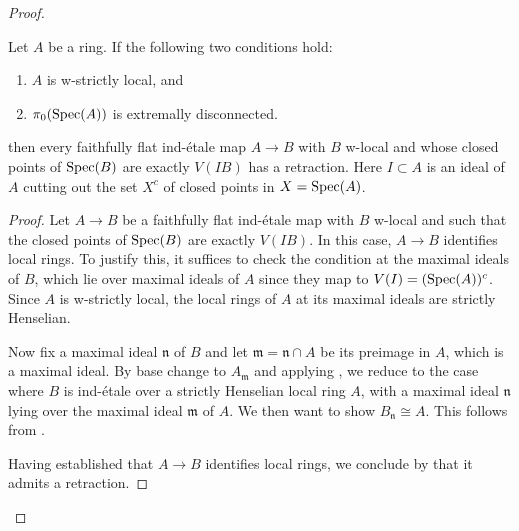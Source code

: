\begin{proof}
\begin{lemma}
  \label{thm:ind-etale-plus-c-has-retraction-if}
  Let $A$ be a ring. If the following two conditions hold:
  \begin{enumerate}
    \item $A$ is w-strictly local, and \label{item:w-strictly-local-ind-etale-plus-c-has-retraction-if}
    \item $\pi_0(\operatorname{Spec} (A))$ is extremally disconnected. \label{item:extremally-disconnected-ind-etale-plus-c-has-retraction-if}
  \end{enumerate}
  then every faithfully flat ind-étale map \(A \to B\) with \(B\) w-local and whose closed points of \(\operatorname{Spec} (B)\) are exactly \(V(IB)\) has a retraction. Here $I \subset A$ is an ideal of $A$ cutting out the set $X^c$ of closed points in $X = \operatorname{Spec} (A)$.
\end{lemma}

\begin{proof}
  Let \(A \to B\) be a faithfully flat ind-étale map with \(B\) w-local and such that the closed points of \(\operatorname{Spec}(B)\) are exactly \(V(IB)\). In this case, \(A \to B\) identifies local rings. To justify this, it suffices to check the condition at the maximal ideals of \(B\), which lie over maximal ideals of \(A\) since they map to \(V(I) = (\operatorname{Spec}(A))^c\). Since \(A\) is w-strictly local, the local rings of \(A\) at its maximal ideals are strictly Henselian.

  Now fix a maximal ideal \(\mathfrak{n}\) of \(B\) and let \(\mathfrak{m} = \mathfrak{n} \cap A\) be its preimage in \(A\), which is a maximal ideal. By base change to \(A_{\mathfrak{m}}\) and applying , we reduce to the case where \(B\) is ind-étale over a strictly Henselian local ring \(A\), with a maximal ideal \(\mathfrak{n}\) lying over the maximal ideal \(\mathfrak{m}\) of \(A\). We then want to show \(B_{\mathfrak{n}} \cong A\). This follows from .

  Having established that \(A \to B\) identifies local rings, we conclude by  that it admits a retraction.
\end{proof}


\end{proof}
